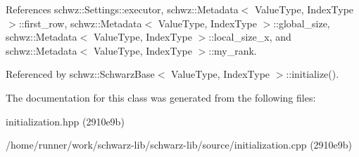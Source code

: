 References schwz\+::\+Settings\+::executor, schwz\+::\+Metadata$<$ Value\+Type, Index\+Type $>$\+::first\+\_\+row, schwz\+::\+Metadata$<$ Value\+Type, Index\+Type $>$\+::global\+\_\+size, schwz\+::\+Metadata$<$ Value\+Type, Index\+Type $>$\+::local\+\_\+size\+\_\+x, and schwz\+::\+Metadata$<$ Value\+Type, Index\+Type $>$\+::my\+\_\+rank.



Referenced by schwz\+::\+Schwarz\+Base$<$ Value\+Type, Index\+Type $>$\+::initialize().



The documentation for this class was generated from the following files\+:\begin{DoxyCompactItemize}
\item 
initialization.\+hpp (2910e9b)\item 
/home/runner/work/schwarz-\/lib/schwarz-\/lib/source/initialization.\+cpp (2910e9b)\end{DoxyCompactItemize}

